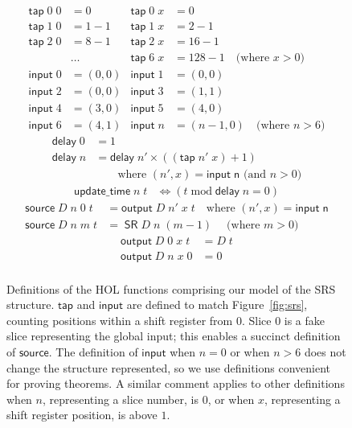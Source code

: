 \documentclass{llncs}
\begin{document}
\begin{figure}
\caption{
Definitions of the HOL functions comprising our model of the SRS structure.
\(\mathsf{tap}\) and \(\mathsf{input}\) are defined to match Figure~\ref{fig:srs}, counting positions within a shift register from $0$.
Slice $0$ is a fake slice representing the global input; this enables a succinct definition of $\mathsf{source}$.
The definition of $\mathsf{input}$ when $n=0$ or when $n>6$ does not change the structure represented, so we use definitions convenient for proving theorems.
A similar comment applies to other definitions when $n$, representing a slice number, is $0$, or when $x$, representing a shift register position, is above $1$.
\label{fig:definitions}}
\begin{align*}
\mathsf{tap}\;0\;0&=0&\mathsf{tap}\;0\;x&=0\\
\mathsf{tap}\;1\;0&=1-1&\mathsf{tap}\;1\;x&=2-1\\
\mathsf{tap}\;2\;0&=8-1&\mathsf{tap}\;2\;x&=16-1\\
&\dots&\mathsf{tap}\;6\;x&=128-1\quad\text{(where $x>0$)}\\
\mathsf{input}\;0&=(0,0)&\mathsf{input}\;1&=(0,0)\\
\mathsf{input}\;2&=(0,0)&\mathsf{input}\;3&=(1,1)\\
\mathsf{input}\;4&=(3,0)&\mathsf{input}\;5&=(4,0)\\
\mathsf{input}\;6&=(4,1)&\mathsf{input}\;n&=(n-1,0)\quad\text{(where $n>6$)}
\end{align*}
\begin{align*}
\mathsf{delay}\;0&=1\\
\mathsf{delay}\;n&=\mathsf{delay}\;n'\times((\mathsf{tap}\;n'\;x)+1)\\
&\qquad\text{where $(n',x)=\mathsf{input\;n}$ (and $n>0$)}
\end{align*}
\begin{align*}
\mathsf{update\_time}\;n\;t&\iff(t\operatorname{mod}\mathsf{delay}\;n=0)
\end{align*}
\begin{align*}
\mathsf{source}\;D\;n\;0\;t&=\mathsf{output}\;D\;n'\;x\;t\quad\text{where $(n',x)=\mathsf{input\;n}$}\\
\mathsf{source}\;D\;n\;m\;t&=\;\mathsf{SR}\;D\;n\;(m-1)\;\quad\text{(where $m>0$)}
\end{align*}
\begin{align*}
\mathsf{output}\;D\;0\;x\;t&=D\;t\\
\mathsf{output}\;D\;n\;x\;0&=0\\

\end{align*}
\end{figure}
\end{document}
